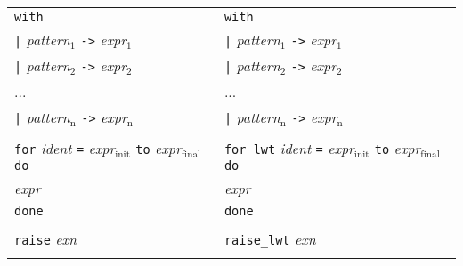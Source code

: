 \begin{tabular}{p{}p{}}
 {\tt with}                                                                       & {\tt with}                                                                           \\
 \emph{ } {\tt |} \emph{pattern$_{\mbox{1}}$} {\tt ->} \emph{expr$_{\mbox{1}}$}                            & \emph{ } {\tt |} \emph{pattern$_{\mbox{1}}$} {\tt ->} \emph{expr$_{\mbox{1}}$}                                \\
 \emph{ } {\tt |} \emph{pattern$_{\mbox{2}}$} {\tt ->} \emph{expr$_{\mbox{2}}$}                            & \emph{ } {\tt |} \emph{pattern$_{\mbox{2}}$} {\tt ->} \emph{expr$_{\mbox{2}}$}                                \\
 \emph{ } ...                                                                        & \emph{ } ...                                                                            \\
 \emph{ } {\tt |} \emph{pattern$_{\mbox{n}}$} {\tt ->} \emph{expr$_{\mbox{n}}$}                            & \emph{ } {\tt |} \emph{pattern$_{\mbox{n}}$} {\tt ->} \emph{expr$_{\mbox{n}}$}                                \\
                                                                                  &                                                                                      \\
 {\tt for} \emph{ident} {\tt =} \emph{expr$_{\mbox{init}}$} {\tt to} \emph{expr$_{\mbox{final}}$} {\tt do} & {\tt for\_lwt} \emph{ident} {\tt =} \emph{expr$_{\mbox{init}}$} {\tt to} \emph{expr$_{\mbox{final}}$} {\tt do} \\
 \emph{ expr}                                                                        & \emph{ expr}                                                                            \\
 {\tt done}                                                                       & {\tt done}                                                                           \\
                                                                                  &                                                                                      \\
 {\tt raise} \emph{exn}                                                              & {\tt raise\_lwt} \emph{exn}                                                              \\
                                                                                  &                                                                                      \\

\end{tabular}
